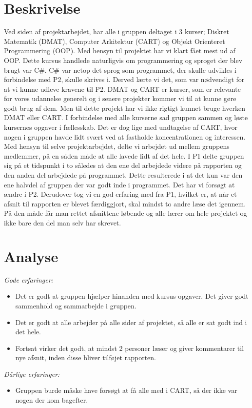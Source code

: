 \section{Beskrivelse}
Ved siden af projektarbejdet, har alle i gruppen deltaget i 3 kurser; Diskret Matematik (DMAT), Computer Arkitektur (CART) og Objekt Orienteret Programmering (OOP). Med hensyn til projektet har vi klart fået mest ud af OOP. Dette kursus handlede naturligvis om programmering og sproget der blev brugt var C\#. C\# var netop det sprog som programmet, der skulle udvikles i forbindelse med P2, skulle skrives i. Derved lærte vi det, som var nødvendigt for at vi kunne udleve kravene til P2. DMAT og CART er kurser, som er relevante for vores udannelse generelt og i senere projekter kommer vi til at kunne gøre godt brug af dem. Men til dette projekt har vi ikke rigtigt kunnet bruge hverken DMAT eller CART.
I forbindelse med alle kurserne sad gruppen sammen og løste kursernes opgaver i fællesskab. Det er dog lige med undtagelse af CART, hvor nogen i gruppen havde lidt svært ved at fastholde koncentrationen og interessen.
Med hensyn til selve projektarbejdet, delte vi arbejdet ud mellem gruppens medlemmer, på en såden måde at alle lavede lidt af det hele. I P1 delte gruppen sig på et tidspunkt i to således at den ene del arbejdede videre på rapporten og den anden del arbejdede på programmet. Dette resulterede i at det kun var den ene halvdel af gruppen der var godt inde i programmet. Det har vi forsøgt at ændre i P2.
Derudover tog vi en god erfaring med fra P1, hvilket er, at når et afsnit til rapporten er blevet færdiggjort, skal mindst to andre læse det igennem. På den måde får man rettet afsnittene løbende og alle lærer om hele projektet og ikke bare den del man selv har skrevet. 

\section{Analyse}

\emph{Gode erfaringer:}
\begin{itemize}
\item Det er godt at gruppen hjælper hinanden med kursus-opgaver. Det giver godt sammenhold og sammarbejde i gruppen. 

\item Det er godt at alle arbejder på alle sider af projektet, så alle er sat godt ind i det hele.

\item	Fortsat virker det godt, at mindst 2 personer læser og giver kommentarer til nye afsnit, inden disse bliver tilføjet rapporten.
\end{itemize}\emph{Dårlige erfaringer:}
\begin{itemize}
\item	Gruppen burde måske have forsøgt at få alle med i CART, så der ikke var nogen der kom bagefter.

\end{itemize}	 


